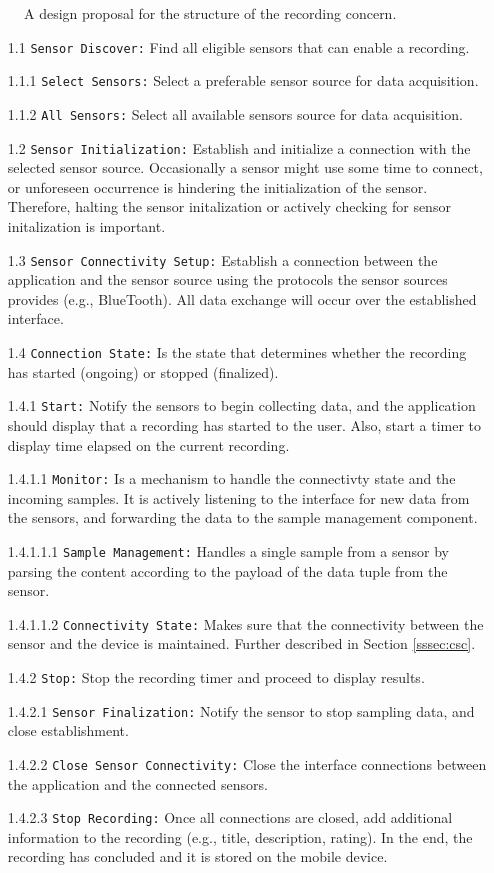 \begin{figure}
    \caption{A design proposal for the structure of the recording concern.}
    \label{fig:hta_recording}
\end{figure}

\begin{itemize}
    \item[1.1] \verb|Sensor Discover:| Find all eligible sensors that can enable a recording.
    \item[1.1.1] \verb|Select Sensors:| Select a preferable sensor source for data acquisition. 
    \item[1.1.2] \verb|All Sensors:| Select all available sensors source for data acquisition.
    \item[1.2] \verb|Sensor Initialization:| Establish and initialize a connection with the selected sensor source. Occasionally a sensor might use some time to connect, or unforeseen occurrence is hindering the initialization of the sensor. Therefore, halting the sensor initalization or actively checking for sensor initalization is important. 
    \item[1.3] \verb|Sensor Connectivity Setup:| Establish a connection between the application and the sensor source using the protocols the sensor sources provides (e.g., BlueTooth). All data exchange will occur over the established interface. 
    \item[1.4] \verb|Connection State:| Is the state that determines whether the recording has started (ongoing) or stopped (finalized).
    \item[1.4.1] \verb|Start:| Notify the sensors to begin collecting data, and the application should display that a recording has started to the user. Also, start a timer to display time elapsed on the current recording. 
    \item[1.4.1.1] \verb|Monitor:| Is a mechanism to handle the connectivty state and the incoming samples. It is actively listening to the interface for new data from the sensors, and forwarding the data to the sample management component.  
    \item[1.4.1.1.1] \verb|Sample Management:| Handles a single sample from a sensor by parsing the content according to the payload of the data tuple from the sensor.
    \item[1.4.1.1.2] \verb|Connectivity State:| Makes sure that the connectivity between the sensor and the device is maintained. Further described in Section \ref{sssec:csc}.
    \item[1.4.2] \verb|Stop:| Stop the recording timer and proceed to display results.
    \item[1.4.2.1] \verb|Sensor Finalization:| Notify the sensor to stop sampling data, and close establishment.
    \item[1.4.2.2] \verb|Close Sensor Connectivity:| Close the interface connections between the application and the connected sensors. 
    \item[1.4.2.3] \verb|Stop Recording:| Once all connections are closed, add additional information to the recording (e.g., title, description, rating). In the end, the recording has concluded and it is stored on the mobile device.
\end{itemize}

